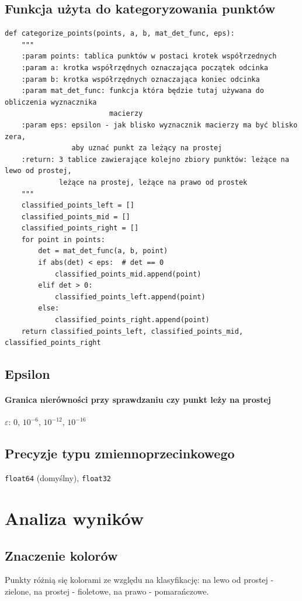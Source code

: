 \documentclass[12pt]{article}
\begin{document}
\newpage

\subsection*{Funkcja użyta do kategoryzowania punktów}
\begin{Verbatim}
def categorize_points(points, a, b, mat_det_func, eps):
	"""
	:param points: tablica punktów w postaci krotek współrzednych
	:param a: krotka współrzędnych oznaczająca początek odcinka
	:param b: krotka współrzędnych oznaczająca koniec odcinka
	:param mat_det_func: funkcja która będzie tutaj używana do obliczenia wyznacznika 
	                     macierzy
	:param eps: epsilon - jak blisko wyznacznik macierzy ma być blisko zera, 
	            aby uznać punkt za leżący na prostej
	:return: 3 tablice zawierające kolejno zbiory punktów: leżące na lewo od prostej, 
	         leżące na prostej, leżące na prawo od prostek
	"""
	classified_points_left = []
	classified_points_mid = []
	classified_points_right = []
	for point in points:
		det = mat_det_func(a, b, point)
		if abs(det) < eps:  # det == 0
			classified_points_mid.append(point)
		elif det > 0:
			classified_points_left.append(point)
		else:
			classified_points_right.append(point)
	return classified_points_left, classified_points_mid, classified_points_right
\end{Verbatim}

\subsection*{Epsilon}
\paragraph*{Granica nierówności przy sprawdzaniu czy punkt leży na prostej} \mbox{}\newline
$\varepsilon$: $0$, $10^{-6}$, $10^{-12}$, $10^{-16}$

\subsection*{Precyzje typu zmiennoprzecinkowego}
\verb*|float64| (domyślny), \verb*|float32|

\newpage

\section*{Analiza wyników}
\subsection*{Znaczenie kolorów}
Punkty różnią się kolorami ze względu na klasyfikację: na lewo od prostej - zielone, na prostej - fioletowe, na prawo - pomarańczowe.
\end{document}
